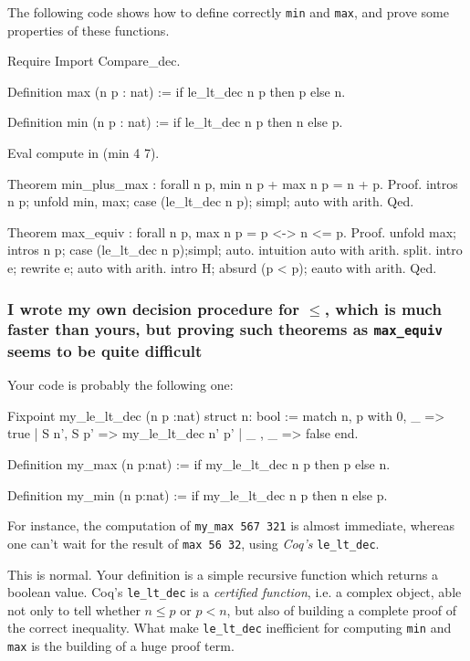 \documentclass[a4paper,pdftex]{article}
\def\Question#1{\stepcounter{question}\subsubsection{#1}}
\begin{document}
The following code shows how to define correctly \texttt{min} and
\texttt{max}, and prove some properties of these functions.

\begin{coq_example}
Require Import Compare_dec.

Definition max (n p : nat) := if le_lt_dec n p then p else n.

Definition min (n p : nat) := if le_lt_dec n p then n else p.

Eval compute in (min 4 7).

Theorem min_plus_max : forall n p, min n p + max n p  = n + p.
Proof.
 intros n p; 
 unfold min, max; 
 case (le_lt_dec n p);
 simpl; auto with arith.
Qed.

Theorem max_equiv : forall n p, max n p = p <-> n <= p.
Proof.
 unfold max; intros n p; case (le_lt_dec n p);simpl; auto.
 intuition auto with arith.
 split. 
 intro e; rewrite e; auto with arith.
 intro H; absurd (p < p); eauto with arith.
Qed.
\end{coq_example}

\Question{I wrote my own decision procedure for $\leq$, which
is much  faster than yours, but proving such theorems as
 \texttt{max\_equiv} seems to be quite difficult}

Your code is probably the following one:

\begin{coq_example}
Fixpoint my_le_lt_dec (n p :nat) {struct n}: bool  :=
 match n, p with 0, _ => true
               | S n', S p' => my_le_lt_dec n' p'
               | _   , _    => false
 end.

Definition my_max (n p:nat) := if my_le_lt_dec n p then p else n.

Definition my_min (n p:nat) := if my_le_lt_dec n p then n else p.
\end{coq_example}


For instance, the computation of \texttt{my\_max 567 321} is almost
immediate, whereas one can't wait for  the result of 
\texttt{max 56 32}, using \emph{Coq's} \texttt{le\_lt\_dec}.

This is normal. Your definition is a simple recursive function which
returns a boolean value. Coq's \texttt{le\_lt\_dec} is a \emph{certified
function}, i.e. a complex object, able not only to tell whether $n\leq p$
or $p<n$, but also of building a complete proof of the correct inequality.
What make \texttt{le\_lt\_dec} inefficient for computing \texttt{min}
and \texttt{max} is the building of a huge proof term.
\end{document}
